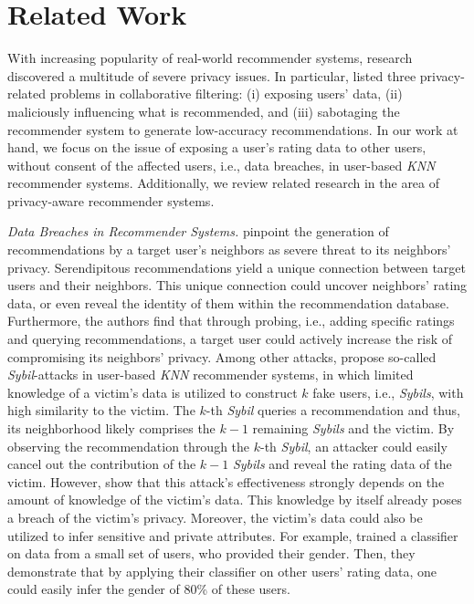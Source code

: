 \documentclass[manuscript,review,anonymous]{acmart}
\begin{document}
\section{Related Work}
With increasing popularity of real-world recommender systems, research discovered a multitude of severe privacy issues.
In particular, \cite{shyong2006you} listed three privacy-related problems in collaborative filtering: (i) exposing users' data, (ii) maliciously influencing what is recommended, and (iii) sabotaging the recommender system to generate low-accuracy recommendations.
In our work at hand, we focus on the issue of exposing a user's rating data to other users, without consent of the affected users, i.e., data breaches, in user-based \emph{KNN} recommender systems. Additionally, we review related research in the area of privacy-aware recommender systems.


\vspace{2mm} \noindent \emph{Data Breaches in Recommender Systems.}
\cite{ramakrishnan2001being} pinpoint the generation of recommendations by a target user's neighbors as severe threat to its neighbors' privacy.
Serendipitous recommendations yield a unique connection between target users and their neighbors.
This unique connection could uncover neighbors' rating data, or even reveal the identity of them within the recommendation database.
Furthermore, the authors find that through probing, i.e., adding specific ratings and querying recommendations, a target user could actively increase the risk of compromising its neighbors' privacy.
Among other attacks, \cite{calandrino2011you} propose so-called \emph{Sybil}-attacks in user-based \emph{KNN} recommender systems, in which limited knowledge of a victim's data is utilized to construct $k$ fake users, i.e., \emph{Sybils}, with high similarity to the victim.
The $k$-th \emph{Sybil} queries a recommendation and thus, its neighborhood likely comprises the $k-1$ remaining \emph{Sybils} and the victim.
By observing the recommendation through the $k$-th \emph{Sybil}, an attacker could easily cancel out the contribution of the $k-1$ \emph{Sybils} and reveal the rating data of the victim.
However, \cite{frey2015collaborative} show that this attack's effectiveness strongly depends on the amount of knowledge of the victim's data.
This knowledge by itself already poses a breach of the victim's privacy.
Moreover, the victim's data could also be utilized to infer sensitive and private attributes.
For example, \cite{weinsberg2012blurme} trained a classifier on data from a small set of users, who provided their gender.
Then, they demonstrate that by applying their classifier on other users' rating data, one could easily infer the gender of 80\% of these users.
\end{document}
